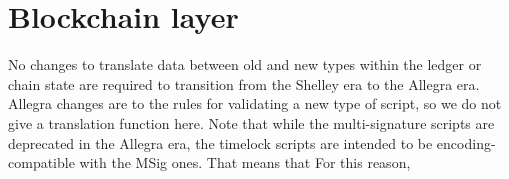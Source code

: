 \section{Blockchain layer}
\label{sec:chain}

\newcommand{\Proof}{\type{Proof}}
\newcommand{\Seedl}{\mathsf{Seed}_\ell}
\newcommand{\Seede}{\mathsf{Seed}_\eta}
\newcommand{\activeSlotCoeff}[1]{\fun{activeSlotCoeff}~ \var{#1}}
\newcommand{\slotToSeed}[1]{\fun{slotToSeed}~ \var{#1}}

\newcommand{\T}{\type{T}}
\newcommand{\vrf}[3]{\fun{vrf}_{#1} ~ #2 ~ #3}
\newcommand{\verifyVrf}[4]{\fun{verifyVrf}_{#1} ~ #2 ~ #3 ~#4}

\newcommand{\HashHeader}{\type{HashHeader}}
\newcommand{\HashBBody}{\type{HashBBody}}
\newcommand{\bhHash}[1]{\fun{bhHash}~ \var{#1}}
\newcommand{\bHeaderSize}[1]{\fun{bHeaderSize}~ \var{#1}}
\newcommand{\bSize}[1]{\fun{bSize}~ \var{#1}}
\newcommand{\bBodySize}[1]{\fun{bBodySize}~ \var{#1}}
\newcommand{\OCert}{\type{OCert}}
\newcommand{\BHeader}{\type{BHeader}}
\newcommand{\BHBody}{\type{BHBody}}

\newcommand{\bheader}[1]{\fun{bheader}~\var{#1}}
\newcommand{\hsig}[1]{\fun{hsig}~\var{#1}}
\newcommand{\bprev}[1]{\fun{bprev}~\var{#1}}
\newcommand{\bhash}[1]{\fun{bhash}~\var{#1}}
\newcommand{\bvkcold}[1]{\fun{bvkcold}~\var{#1}}
\newcommand{\bseedl}[1]{\fun{bseed}_{\ell}~\var{#1}}
\newcommand{\bprfn}[1]{\fun{bprf}_{n}~\var{#1}}
\newcommand{\bseedn}[1]{\fun{bseed}_{n}~\var{#1}}
\newcommand{\bprfl}[1]{\fun{bprf}_{\ell}~\var{#1}}
\newcommand{\bocert}[1]{\fun{bocert}~\var{#1}}
\newcommand{\bnonce}[1]{\fun{bnonce}~\var{#1}}
\newcommand{\bleader}[1]{\fun{bleader}~\var{#1}}
\newcommand{\hBbsize}[1]{\fun{hBbsize}~\var{#1}}
\newcommand{\bbodyhash}[1]{\fun{bbodyhash}~\var{#1}}
\newcommand{\overlaySchedule}[4]{\fun{overlaySchedule}~\var{#1}~\var{#2}~{#3}~\var{#4}}

\newcommand{\PrtclState}{\type{PrtclState}}
\newcommand{\PrtclEnv}{\type{PrtclEnv}}
\newcommand{\OverlayEnv}{\type{OverlayEnv}}
\newcommand{\VRFState}{\type{VRFState}}
\newcommand{\NewEpochEnv}{\type{NewEpochEnv}}
\newcommand{\NewEpochState}{\type{NewEpochState}}
\newcommand{\PoolDistr}{\type{PoolDistr}}
\newcommand{\BBodyEnv}{\type{BBodyEnv}}
\newcommand{\BBodyState}{\type{BBodyState}}
\newcommand{\RUpdEnv}{\type{RUpdEnv}}
\newcommand{\ChainEnv}{\type{ChainEnv}}
\newcommand{\ChainState}{\type{ChainState}}
\newcommand{\ChainSig}{\type{ChainSig}}

No changes to translate data between old and new types within the ledger or chain
state are required to transition from the
Shelley era to the Allegra era. Allegra changes are to the rules for
validating a new type of script, so we do not give a translation function here.
Note that while the multi-signature scripts are deprecated in the Allegra era,
the timelock scripts are intended to be encoding-compatible with the MSig ones.
That means that
For this reason,

